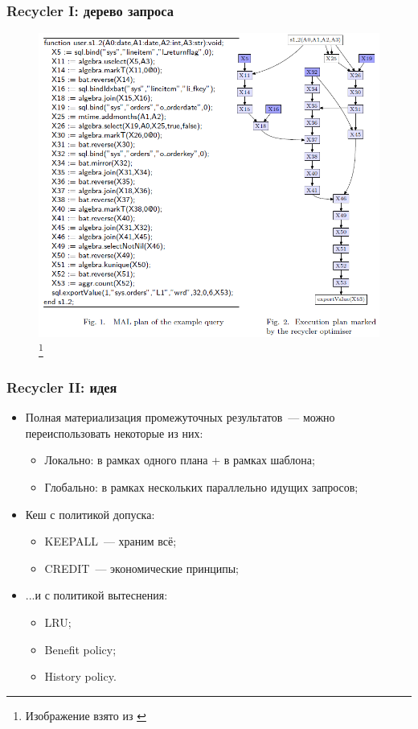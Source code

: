 \documentclass{beamer}
\begin{document}
\begin{frame}
\frametitle{Recycler I: дерево запроса}

\begin{figure}[htb]
\includegraphics[width=\textwidth,height=0.750\textheight,keepaspectratio]{recycler.png} 
\footnote{\tiny{Изображение взято из \cite{Ivanova2010}}}
\end{figure}

\end{frame}

\begin{frame}
\frametitle{Recycler II: идея}

\begin{itemize}
  \setlength\itemsep{1em}
  \item Полная материализация промежуточных результатов~--- можно переиспользовать некоторые из них:
  \begin{itemize}
    \setlength\itemsep{1em}
    \item Локально: в рамках одного плана + в рамках шаблона;
    \item Глобально: в рамках нескольких параллельно идущих запросов;
  \end{itemize}
  \item Кеш с политикой допуска:
  \begin{itemize}
    \setlength\itemsep{1em}
    \item KEEPALL~--- храним всё;
    \item CREDIT~--- экономические принципы;
  \end{itemize}
  \item ...и с политикой вытеснения:
  \begin{itemize}
    \setlength\itemsep{1em}
    \item LRU;
    \item Benefit policy;
    \item History policy.
  \end{itemize}
  
\end{itemize}
\end{frame}
\end{document}
